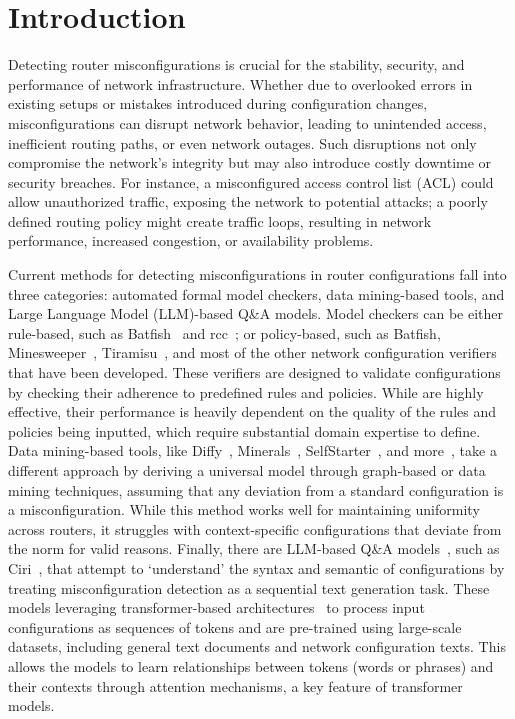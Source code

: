 
\section{Introduction}
\label{sec:intro}

Detecting router misconfigurations is crucial for the stability, security, and
performance of network infrastructure. Whether due to overlooked errors in
existing setups or mistakes introduced during configuration changes,
misconfigurations can disrupt network behavior, leading to unintended access,
inefficient routing paths, or even network outages. Such disruptions not only
compromise the network’s integrity but may also introduce costly downtime or
security breaches. For instance, a misconfigured access control list (ACL)
could allow unauthorized traffic, exposing the network to potential attacks; a
poorly defined routing policy might create traffic loops, resulting in network
performance, increased congestion, or availability problems.

Current methods for detecting misconfigurations in router configurations fall
into three categories: automated formal model checkers, data mining-based
tools, and Large Language Model (LLM)-based Q\&A models. Model checkers can be
either rule-based, such as Batfish~\cite{fogel2015general} and
rcc~\cite{feamster2005detecting}; or policy-based, such as Batfish,
Minesweeper~\cite{beckett2017general},
Tiramisu~\cite{abhashkumar2020tiramisu}, and most of the other network
configuration verifiers~\cite{kakarla2020finding,prabhu2020plankton,
al2009network, ritchey2000using,al2011configchecker, jeffrey2009model} that
have been developed. These verifiers are designed to validate configurations
by checking their adherence to predefined rules and policies. While are highly
effective, their performance is heavily dependent on the quality of the rules
and policies being inputted, which require substantial domain expertise to
define. Data mining-based tools, like Diffy~\cite{kakarla2024diffy},
Minerals~\cite{le2006minerals}, SelfStarter~\cite{kakarla2020finding}, and
more~\cite{le2008detecting,le2006characterization}, take a different approach
by deriving a universal model through graph-based or data mining techniques,
assuming that any deviation from a standard configuration is a
misconfiguration. While this method works well for maintaining uniformity
across routers, it struggles with context-specific configurations that deviate
from the norm for valid reasons. Finally, there are LLM-based Q\&A
models~\cite{bogdanov2024leveraging,chen2024automatic,wang2024identifying,liu2024large,
wang2024netconfeval}, such as Ciri~\cite{lian2023configuration}, that attempt
to `understand' the syntax and semantic of configurations by treating
misconfiguration detection as a sequential text generation task. These models
leveraging transformer-based architectures~\cite{vaswani2017attention} to
process input configurations as sequences of tokens and are pre-trained using
large-scale datasets, including general text documents and network
configuration texts. This allows the models to learn relationships between
tokens (words or phrases) and their contexts through attention mechanisms, a
key feature of transformer models.


